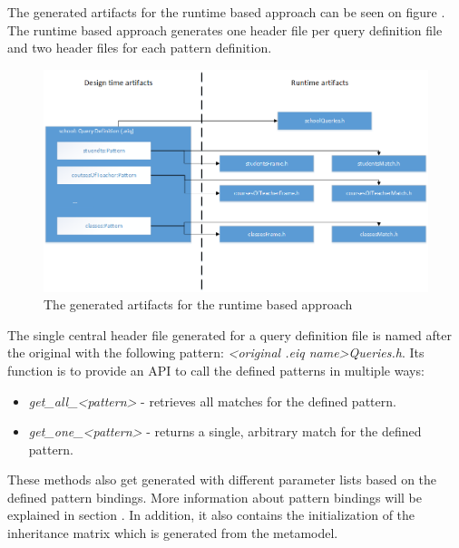 The generated artifacts for the runtime based approach can be seen on figure
. The runtime based approach generates one header file per
query definition file and two header files for each pattern definition. 

\begin{figure}[!ht]
\centering
\includegraphics[width=130mm, keepaspectratio]{figures/runtime_gen_art.png}
\caption{The generated artifacts for the runtime based approach}
\label{fig:runtime_gen}
\end{figure}

The single central header file generated for a query definition file is named
after the original with the following pattern: \emph{<original .eiq name>Queries.h}.
Its function is to provide an API to call the defined patterns in multiple
ways:

\begin{itemize}
  \item \emph{get\_all\_<pattern>} - retrieves all matches for the defined pattern.
  \item \emph{get\_one\_<pattern>} - returns a single, arbitrary match for
  the defined pattern.
\end{itemize}

These methods also get generated with different parameter lists based on the
defined pattern bindings. More information about pattern bindings will be
explained in section . In addition, it also contains
the initialization of the inheritance matrix which is generated from the
metamodel.

